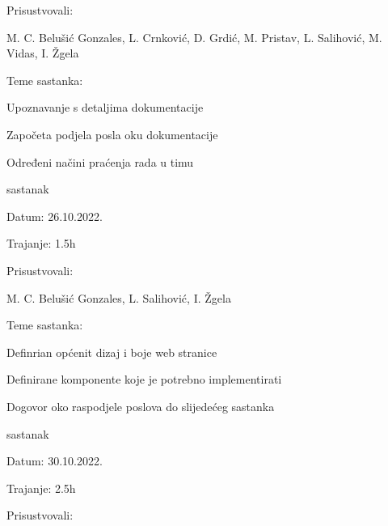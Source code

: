 \begin{packed_enum}
\begin{packed_item}
			
			\item Prisustvovali: \begin{packed_enum}
				
				\item[]  M. C. Belušić Gonzales,
				L. Crnković,
				D. Grdić,
				M. Pristav,
				L. Salihović,
				M. Vidas,
				I. Žgela
			\end{packed_enum}
			\item Teme sastanka:
			\begin{packed_item}
				\item  Upoznavanje s detaljima dokumentacije
				\item Započeta podjela posla oku dokumentacije
				\item Određeni načini praćenja rada u timu
			\end{packed_item}
		\end{packed_item}
	
		\item  sastanak
	
	\item[] \begin{packed_item}
		\item Datum: 26.10.2022.
		\item Trajanje: 1.5h
		
		
		\item Prisustvovali: \begin{packed_enum}
			
			\item[]  M. C. Belušić Gonzales,
			L. Salihović,
			I. Žgela
		\end{packed_enum}
		\item Teme sastanka:
		\begin{packed_item}
			\item  Definrian općenit dizaj i boje web stranice
			\item  Definirane komponente koje je potrebno implementirati
			\item Dogovor oko raspodjele poslova do slijedećeg sastanka
		\end{packed_item}
	\end{packed_item}
\item  sastanak

\item[] \begin{packed_item}
	\item Datum: 30.10.2022.
	\item Trajanje: 2.5h
	
	
	\item Prisustvovali: \begin{packed_enum}
		

\end{packed_enum}
\end{packed_item}
\end{packed_enum}
